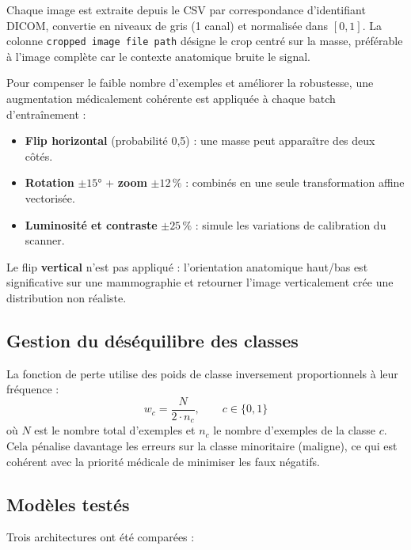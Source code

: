 \documentclass[a4paper,10pt]{article}
\begin{document}
Chaque image est extraite depuis le CSV par correspondance d'identifiant DICOM,
convertie en niveaux de gris (1 canal) et normalisée dans $[0,1]$.
La colonne \texttt{cropped image file path} désigne le crop centré sur la masse,
préférable à l'image complète car le contexte anatomique bruite le signal.

Pour compenser le faible nombre d'exemples et améliorer la robustesse,
une augmentation médicalement cohérente est appliquée à chaque batch d'entraînement :

\begin{itemize}
    \item \textbf{Flip horizontal} (probabilité 0,5) : une masse peut apparaître des deux côtés.
    \item \textbf{Rotation} $\pm 15°$ + \textbf{zoom} $\pm 12\,\%$ : combinés en une seule transformation affine vectorisée.
    \item \textbf{Luminosité et contraste} $\pm 25\,\%$ : simule les variations de calibration du scanner.
\end{itemize}

Le flip \textbf{vertical} n'est pas appliqué : l'orientation anatomique haut/bas est significative
sur une mammographie et retourner l'image verticalement crée une distribution non réaliste.

\subsection{Gestion du déséquilibre des classes}

La fonction de perte utilise des poids de classe inversement proportionnels à leur fréquence :
\[
w_c = \frac{N}{2 \cdot n_c}, \qquad c \in \{0, 1\}
\]
où $N$ est le nombre total d'exemples et $n_c$ le nombre d'exemples de la classe $c$.
Cela pénalise davantage les erreurs sur la classe minoritaire (maligne),
ce qui est cohérent avec la priorité médicale de minimiser les faux négatifs.

\subsection{Modèles testés}

Trois architectures ont été comparées :
\end{document}
